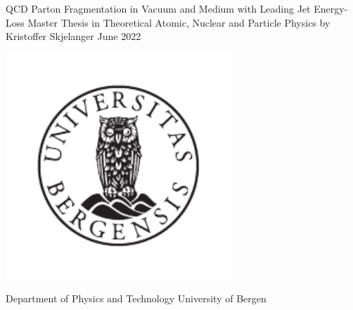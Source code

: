 \documentclass[11pt]{article}
\begin{document}
    \begin{titlepage}
    \begin{center}
        \vspace*{\fill}
        \Huge{QCD Parton Fragmentation in Vacuum and Medium with Leading Jet Energy-Loss} 
        \endgraf 
        \vspace*{\fill}
        \Large{Master Thesis in Theoretical Atomic, Nuclear and Particle Physics}
        \vfill
        \large{by } \endgraf \Large{Kristoffer Skjelanger} \endgraf \large{June 2022}
    \end{center}
    \thispagestyle{empty}
    \vspace*{\fill}

    \begin{center}
        \includegraphics[width=8.5cm]{pictures/UiB-emblem_gray.pdf}
        \vspace*{\fill}
        
        \Large{Department of Physics and Technology \endgraf University of Bergen}
    \end{center}
    \vfill
    \end{titlepage}

    \newpage
    
    
    \newpage
    \tableofcontents    

    \clearpage
        
    \clearpage   
        
    \clearpage
        
    \clearpage
        
    \clearpage
        
    \clearpage
        
    \clearpage
        

    \appendix
    \begin{appendices}
        \clearpage
            
        \clearpage
            
    \end{appendices}
        
    \clearpage
    \printbibliography
\end{document}
